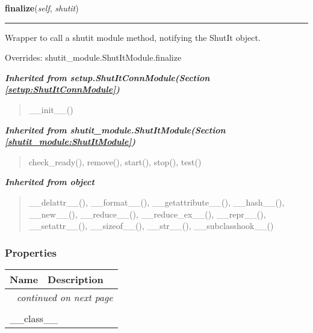     \vspace{0.5ex}

\hspace{.8\funcindent}\begin{boxedminipage}{\funcwidth}

    \raggedright \textbf{finalize}(\textit{self}, \textit{shutit})

    \vspace{-1.5ex}

    \rule{\textwidth}{0.5\fboxrule}
\setlength{\parskip}{2ex}
    Wrapper to call a shutit module method, notifying the ShutIt object.

\setlength{\parskip}{1ex}
      Overrides: shutit\_module.ShutItModule.finalize

    \end{boxedminipage}


\large{\textbf{\textit{Inherited from setup.ShutItConnModule\textit{(Section \ref{setup:ShutItConnModule})}}}}

\begin{quote}
\_\_init\_\_()
\end{quote}

\large{\textbf{\textit{Inherited from shutit\_module.ShutItModule\textit{(Section \ref{shutit_module:ShutItModule})}}}}

\begin{quote}
check\_ready(), remove(), start(), stop(), test()
\end{quote}

\large{\textbf{\textit{Inherited from object}}}

\begin{quote}
\_\_delattr\_\_(), \_\_format\_\_(), \_\_getattribute\_\_(), \_\_hash\_\_(), \_\_new\_\_(), \_\_reduce\_\_(), \_\_reduce\_ex\_\_(), \_\_repr\_\_(), \_\_setattr\_\_(), \_\_sizeof\_\_(), \_\_str\_\_(), \_\_subclasshook\_\_()
\end{quote}


  \subsubsection{Properties}

    \vspace{-1cm}
\hspace{\varindent}\begin{longtable}{|p{\varnamewidth}|p{\vardescrwidth}|l}
\cline{1-2}
\cline{1-2} \centering \textbf{Name} & \centering \textbf{Description}& \\
\cline{1-2}
\endhead\cline{1-2}\multicolumn{3}{r}{\small\textit{continued on next page}}\\\endfoot\cline{1-2}
\endlastfoot\multicolumn{2}{|l|}{\textit{Inherited from object}}\\
\multicolumn{2}{|p{\varwidth}|}{\raggedright \_\_class\_\_}\\
\cline{1-2}
\end{longtable}



